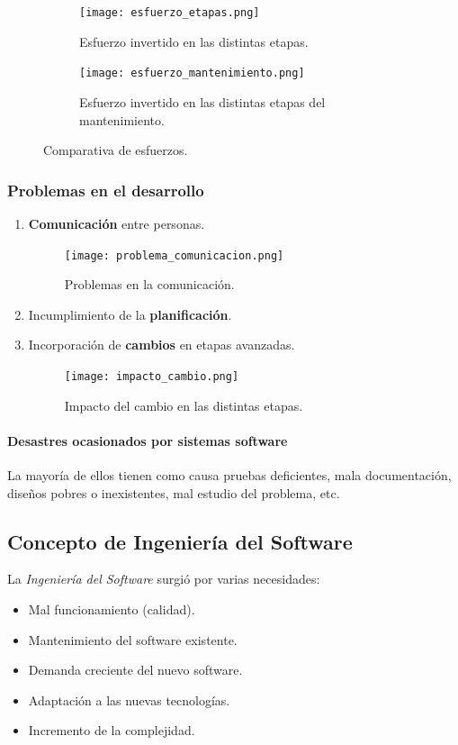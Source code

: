 \documentclass[12pt,spanish]{article}
\begin{document}
\begin{figure}[H]
	\centering
	\begin{subfigure}[b]{0.4\textwidth}
	\texttt{[image: esfuerzo\_etapas.png]}
	\caption{Esfuerzo invertido en las distintas etapas.}
	\end{subfigure}
	\qquad
	\begin{subfigure}[b]{0.4\textwidth}
	\texttt{[image: esfuerzo\_mantenimiento.png]}
	\caption{Esfuerzo invertido en las distintas etapas del mantenimiento.}
	\end{subfigure}
	\caption{Comparativa de esfuerzos.}
\end{figure}


\newpage

\subsubsection{Problemas en el desarrollo}

\begin{enumerate}
	\item \textbf{Comunicación} entre personas.
		\begin{figure}[H]
		\centering
		\texttt{[image: problema\_comunicacion.png]}
		\caption{Problemas en la comunicación.}
		\end{figure}
	\item Incumplimiento de la \textbf{planificación}.
	\item Incorporación de \textbf{cambios} en etapas avanzadas.
		\begin{figure}[H]
		\centering
		\texttt{[image: impacto\_cambio.png]}
		\caption{Impacto del cambio en las distintas etapas.}
		\end{figure}
\end{enumerate}

\paragraph{Desastres ocasionados por sistemas software}
La mayoría de ellos tienen como causa pruebas deficientes, mala documentación, diseños pobres o inexistentes, mal estudio del problema, etc.

\subsection{Concepto de Ingeniería del Software}

La \emph{Ingeniería del Software} surgió por varias necesidades:
\begin{itemize}
	\item Mal funcionamiento (calidad).
	\item Mantenimiento del software existente.
	\item Demanda creciente del nuevo software.
	\item Adaptación a las nuevas tecnologías.
	\item Incremento de la complejidad.
\end{itemize}
\end{document}
